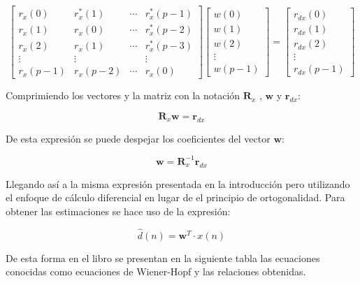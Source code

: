 \documentclass[a4paper]{article}
\begin{document}
\begin{equation}
	\begin{bmatrix}
		r_x(0)     & r_x^*(1)   & \cdots & r_x^*(p-1) \\
		r_x(1)     & r_x(0)     & \cdots & r_x^*(p-2) \\
		r_x(2)     & r_x(1)     & \cdots & r_x^*(p-3) \\
		\vdots     & \vdots     &        & \vdots     \\
		r_x(p-1)   & r_x(p-2)   & \cdots & r_x(0)
	\end{bmatrix}
	\begin{bmatrix}
		w(0) \\
		w(1) \\
		w(2) \\
		\vdots \\
		w(p-1)
	\end{bmatrix}
	=
	\begin{bmatrix}
		r_{dx}(0) \\
		r_{dx}(1) \\
		r_{dx}(2) \\
		\vdots \\
		r_{dx}(p-1)
	\end{bmatrix}
\end{equation}


Comprimiendo los vectores y la matriz con la notación $\mathbf{R}_x$ , $\mathbf{w} $ y $ \mathbf{r}_{dx}$:

\begin{equation}
	\boxed{\mathbf{R}_x \mathbf{w} = \mathbf{r}_{dx}}
\end{equation}

De esta expresión se puede despejar los coeficientes del vector $\mathbf{w} $:

\begin{equation}
	\boxed{ \mathbf{w} = \mathbf{R}_x^{-1}\mathbf{r}_{dx}}
\end{equation}

Llegando así a la misma expresión presentada en la introducción pero utilizando el enfoque de cálculo diferencial en lugar de el principio de ortogonalidad. Para obtener las estimaciones se hace uso de la expresión: 


\begin{equation}
	\boxed{ \hat{d}(n) = \mathbf{w}^T \cdot x(n) }
\end{equation}

De esta forma en el libro se presentan en la siguiente tabla las ecuaciones conocidas como ecuaciones de Wiener-Hopf y las relaciones obtenidas.
\end{document}
